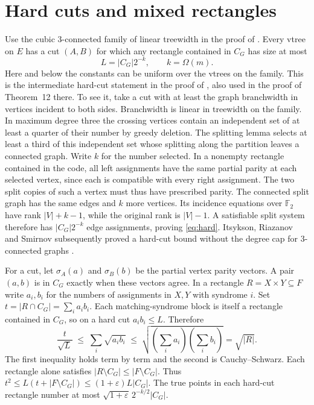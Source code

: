 \documentclass[11pt,a4paper]{amsart}
\newcommand{\F}{\mathbb F_2}
\begin{document}
\section{Hard cuts and mixed rectangles}
Use the cubic $3$-connected family of linear treewidth in the proof of \cite[Lemma~33]{thesis}. Every vtree on $E$ has a cut $(A,B)$ for which any rectangle contained in $C_G$ has size at most
\begin{equation}\label{eq:hard}
                  L=|C_G|2^{-k},\qquad k=\Omega(m).
\end{equation}
Here and below the constants can be uniform over the vtrees on the family. This is the intermediate hard-cut statement in the proof of \cite[Theorem~5]{thesis}, also used in the proof of Theorem~12 there. To see it, take a cut with at least the graph branchwidth in vertices incident to both sides. Branchwidth is linear in treewidth on the family. In maximum degree three the crossing vertices contain an independent set of at least a quarter of their number by greedy deletion. The splitting lemma \cite[Lemma~22]{thesis} selects at least a third of this independent set whose splitting along the partition leaves a connected graph. Write $k$ for the number selected. In a nonempty rectangle contained in the code, all left assignments have the same partial parity at each selected vertex, since each is compatible with every right assignment. The two split copies of such a vertex must thus have prescribed parity. The connected split graph has the same edges and $k$ more vertices. Its incidence equations over $\F$ have rank $|V|+k-1$, while the original rank is $|V|-1$. A satisfiable split system therefore has $|C_G|2^{-k}$ edge assignments, proving \eqref{eq:hard}. Itsykson, Riazanov and Smirnov subsequently proved a hard-cut bound without the degree cap for $3$-connected graphs \cite[\S4.2]{tight}.

For a cut, let $\sigma_A(a)$ and $\sigma_B(b)$ be the partial vertex parity vectors. A pair $(a,b)$ is in $C_G$ exactly when these vectors agree. In a rectangle $R=X\times Y\subseteq F$ write $a_i,b_i$ for the numbers of assignments in $X,Y$ with syndrome $i$. Set $t=|R\cap C_G|=\sum_i a_i b_i$. Each matching-syndrome block is itself a rectangle contained in $C_G$, so on a hard cut $a_i b_i\leq L$. Therefore
\begin{equation}\label{eq:mixed}
\frac{t}{\sqrt L}\;\leq\;\sum_i\sqrt{a_i b_i}\;\leq\;
   \sqrt{\left(\sum_i a_i\right)\left(\sum_i b_i\right)}=\sqrt{|R|}.
\end{equation}
The first inequality holds term by term and the second is Cauchy--Schwarz. Each rectangle alone satisfies $|R\setminus C_G|\leq|F\setminus C_G|$. Thus $t^2\leq L(t+|F\setminus C_G|)\leq(1+\varepsilon)L|C_G|$. The true points in each hard-cut rectangle number at most $\sqrt{1+\varepsilon}\,2^{-k/2}|C_G|$.
\end{document}
